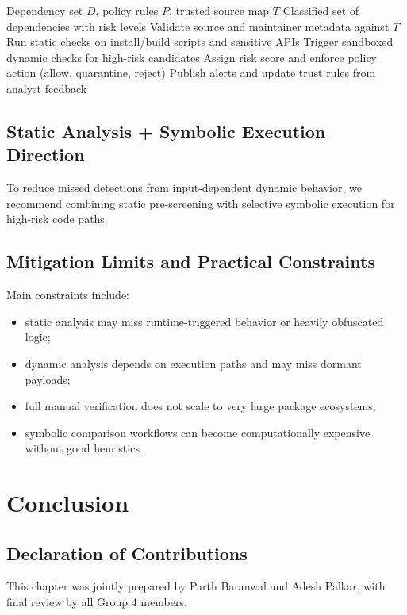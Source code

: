 \begin{algorithm}[htbp]
\caption{Layered Screening for Third-party Dependencies}
\label{alg:layered-screening}
\begin{algorithmic}[1]
\Require Dependency set $D$, policy rules $P$, trusted source map $T$
\Ensure Classified set of dependencies with risk levels
\State Validate source and maintainer metadata against $T$
\State Run static checks on install/build scripts and sensitive APIs
\State Trigger sandboxed dynamic checks for high-risk candidates
\State Assign risk score and enforce policy action (allow, quarantine, reject)
\EndFor
\State Publish alerts and update trust rules from analyst feedback
\end{algorithmic}
\end{algorithm}

\section{Static Analysis + Symbolic Execution Direction}

To reduce missed detections from input-dependent dynamic behavior,
we recommend combining static pre-screening with selective symbolic execution for
high-risk code paths.

\section{Mitigation Limits and Practical Constraints}

Main constraints include:

\begin{itemize}
\item static analysis may miss runtime-triggered behavior or heavily obfuscated logic;
\item dynamic analysis depends on execution paths and may miss dormant payloads;
\item full manual verification does not scale to very large package ecosystems;
\item symbolic comparison workflows can become computationally expensive without good heuristics.
\end{itemize}

\chapter{Conclusion}
\label{ch:conclusion}

\section*{Declaration of Contributions}
This chapter was jointly prepared by Parth Baranwal and Adesh Palkar,
with final review by all Group 4 members.

